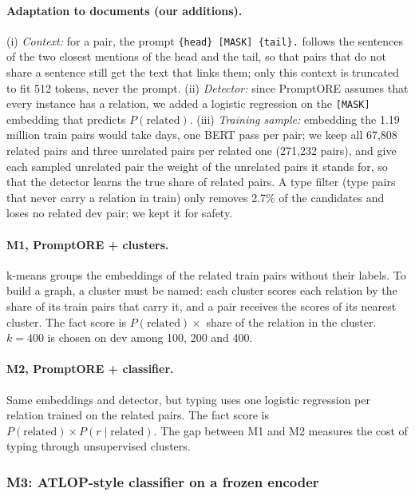 \documentclass[pdflatex,sn-mathphys-num]{sn-jnl}
\begin{document}
\paragraph{Adaptation to documents (our additions).} (i) \emph{Context:} for a pair, the prompt \texttt{\{head\} [MASK] \{tail\}.} follows the sentences of the two closest mentions of the head and the tail, so that pairs that do not share a sentence still get the text that links them; only this context is truncated to fit 512 tokens, never the prompt. (ii) \emph{Detector:} since PromptORE assumes that every instance has a relation, we added a logistic regression on the \texttt{[MASK]} embedding that predicts $P(\text{related})$. (iii) \emph{Training sample:} embedding the 1.19 million train pairs would take days, one BERT pass per pair; we keep all 67,808 related pairs and three unrelated pairs per related one (271,232 pairs), and give each sampled unrelated pair the weight of the unrelated pairs it stands for, so that the detector learns the true share of related pairs. A type filter (type pairs that never carry a relation in train) only removes 2.7\% of the candidates and loses no related dev pair; we kept it for safety.

\paragraph{M1, PromptORE + clusters.} k-means groups the embeddings of the related train pairs without their labels. To build a graph, a cluster must be named: each cluster scores each relation by the share of its train pairs that carry it, and a pair receives the scores of its nearest cluster. The fact score is $P(\text{related}) \times$ share of the relation in the cluster. $k=400$ is chosen on dev among 100, 200 and 400.

\paragraph{M2, PromptORE + classifier.} Same embeddings and detector, but typing uses one logistic regression per relation trained on the related pairs. The fact score is $P(\text{related}) \times P(r \mid \text{related})$. The gap between M1 and M2 measures the cost of typing through unsupervised clusters.

\subsubsection{M3: ATLOP-style classifier on a frozen encoder}\label{sec:atlop}
\end{document}
